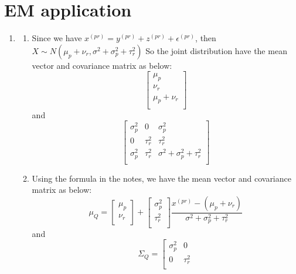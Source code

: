 \documentclass[12pt]{article}
\begin{document}
    \section*{EM application}
    \begin{enumerate}[label=(\alph*)]
        \item \begin{enumerate}[label=(\roman*)]
            \item Since we have $x^{(pr)} = y^{(pr)} + z^{(pr)} + \epsilon^{(pr)}$, then $X\sim N(\mu_p+\nu_r,\sigma^2+\sigma_p^2+\tau_r^2)$
            So the joint distribution have the mean vector and covariance matrix as below:
            $$
            \left[\begin{matrix}
                \mu_p \\
                \nu_r \\
                \mu_p+\nu_r \\
            \end{matrix}\right]
            $$ 
            and
            $$
            \left[\begin{matrix}
                \sigma_p^2  & 0 & \sigma_p^2 \\
                0 & \tau_r^2 & \tau_r^2 \\
                \sigma_p^2 & \tau_r^2 & \sigma^2+\sigma_p^2+\tau_r^2\\
            \end{matrix}\right]
            $$ 
            \item Using the formula in the notes, we have the mean vector and covariance matrix as below:
            $$
            \mu_Q = 
            \left[\begin{matrix}
                \mu_p \\
                \nu_r \\
            \end{matrix}\right]
            +
            \left[\begin{matrix}
                \sigma_p^2 \\
                \tau_r^2 \\
            \end{matrix}\right]\frac{x^{(pr)}-(\mu_p+\nu_r)}{\sigma^2+\sigma_p^2+\tau_r^2}
            $$ 
            and
            $$
            \Sigma_Q = 
            \left[\begin{matrix}
                \sigma_p^2  & 0  \\
                0 & \tau_r^2 \\

\end{matrix}$$
\end{enumerate}
\end{enumerate}
\end{document}
